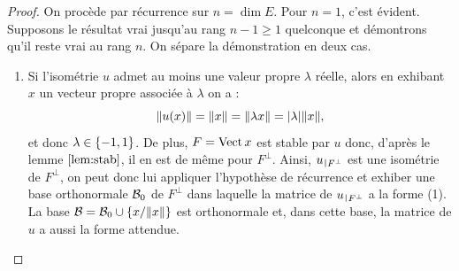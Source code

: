 \begin{proof}
On procède par récurrence sur $n = \dim{E}$. Pour $n=1$, c'est évident. \\
Supposons le résultat vrai jusqu'au rang $n-1 \geq 1$ quelconque et démontrons qu'il reste vrai au rang $n$. 
On sépare la démonstration en deux cas.
\begin{enumerate}[label=(\alph*)]

\item
Si l'isométrie $u$ admet au moins une valeur propre $\lambda$ réelle, alors en exhibant $x$ un vecteur propre associée à $\lambda$
on a :
\[ \lVert u(x)\rVert = \lVert x\rVert = \lVert\lambda x\rVert = \lvert\lambda\rvert \lVert x\rVert , \]
et donc $\lambda \in \{ -1, 1 \}$.
De plus, $F = \operatorname{Vect}{x}$ est stable par $u$ donc, d'après le lemme $\ref{lem:stab}$, il en est de même pour $F^{\perp}$.
Ainsi, $\restr{u}{F^{\perp}}$ est une isométrie de $F^{\perp}$, on peut donc lui appliquer l'hypothèse de récurrence et exhiber une base
orthonormale $\mathcal{B}_0$ de $F^{\perp}$ dans laquelle la matrice de $\restr{u}{F^{\perp}}$ a la forme (1).
La base $\mathcal{B} = \mathcal{B}_0 \cup \{ x/\lVert x\rVert \}$ est orthonormale et, dans cette base, la matrice de $u$ a aussi la forme attendue.


\end{enumerate}
\end{proof}
